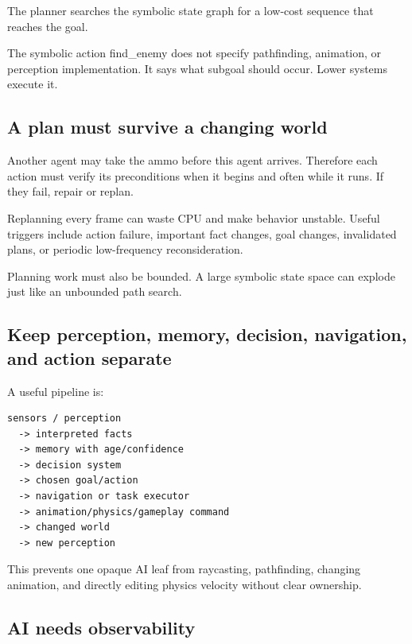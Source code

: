 The planner searches the symbolic state graph for a low-cost sequence that reaches the goal.

The symbolic action find\_enemy does not specify pathfinding, animation, or perception implementation. It says what subgoal should occur. Lower systems execute it.

\subsection{A plan must survive a changing world}\label{06-engine-ii-ch047-a-plan-must-survive-a-changing-world}

\hypertarget{06-engine-ii-ch047-a-plan-must-survive-a-changing-world}{}

Another agent may take the ammo before this agent arrives. Therefore each action must verify its preconditions when it begins and often while it runs. If they fail, repair or replan.

Replanning every frame can waste CPU and make behavior unstable. Useful triggers include action failure, important fact changes, goal changes, invalidated plans, or periodic low-frequency reconsideration.

Planning work must also be bounded. A large symbolic state space can explode just like an unbounded path search.

\subsection{Keep perception, memory, decision, navigation, and action separate}\label{06-engine-ii-ch047-keep-perception-memory-decision-navigation-and-action-separate}

\hypertarget{06-engine-ii-ch047-keep-perception-memory-decision-navigation-and-action-separate}{}

A useful pipeline is:

\begin{verbatim}
sensors / perception
  -> interpreted facts
  -> memory with age/confidence
  -> decision system
  -> chosen goal/action
  -> navigation or task executor
  -> animation/physics/gameplay command
  -> changed world
  -> new perception
\end{verbatim}

This prevents one opaque AI leaf from raycasting, pathfinding, changing animation, and directly editing physics velocity without clear ownership.

\subsection{AI needs observability}\label{06-engine-ii-ch047-ai-needs-observability}

